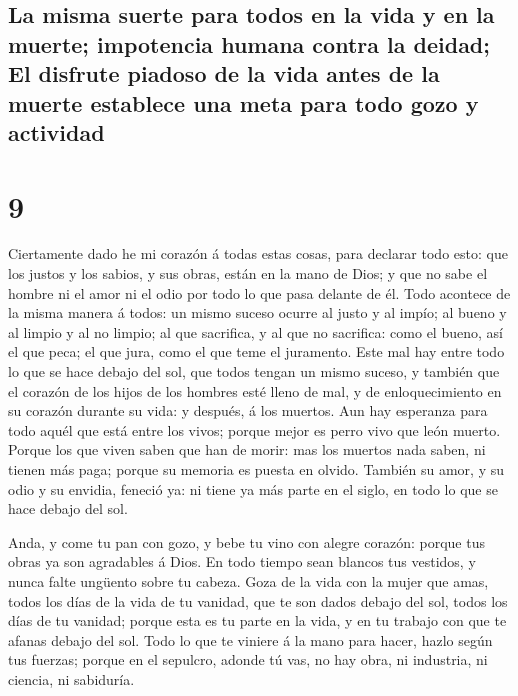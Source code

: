 \hypertarget{la-misma-suerte-para-todos-en-la-vida-y-en-la-muerte-impotencia-humana-contra-la-deidad-el-disfrute-piadoso-de-la-vida-antes-de-la-muerte-establece-una-meta-para-todo-gozo-y-actividad}{%
\subsection{La misma suerte para todos en la vida y en la muerte;
impotencia humana contra la deidad; El disfrute piadoso de la vida antes
de la muerte establece una meta para todo gozo y
actividad}\label{la-misma-suerte-para-todos-en-la-vida-y-en-la-muerte-impotencia-humana-contra-la-deidad-el-disfrute-piadoso-de-la-vida-antes-de-la-muerte-establece-una-meta-para-todo-gozo-y-actividad}}

\hypertarget{section-8}{%
\section{9}\label{section-8}}

 Ciertamente dado he mi corazón á todas estas cosas, para
declarar todo esto: que los justos y los sabios, y sus obras, están en
la mano de Dios; y que no sabe el hombre ni el amor ni el odio por todo
lo que pasa delante de él.  Todo acontece de la misma
manera á todos: un mismo suceso ocurre al justo y al impío; al bueno y
al limpio y al no limpio; al que sacrifica, y al que no sacrifica: como
el bueno, así el que peca; el que jura, como el que teme el juramento.
 Este mal hay entre todo lo que se hace debajo del sol,
que todos tengan un mismo suceso, y también que el corazón de los hijos
de los hombres esté lleno de mal, y de enloquecimiento en su corazón
durante su vida: y después, á los muertos.  Aun hay
esperanza para todo aquél que está entre los vivos; porque mejor es
perro vivo que león muerto.  Porque los que viven saben
que han de morir: mas los muertos nada saben, ni tienen más paga; porque
su memoria es puesta en olvido.  También su amor, y su
odio y su envidia, feneció ya: ni tiene ya más parte en el siglo, en
todo lo que se hace debajo del sol.

 Anda, y come tu pan con gozo, y bebe tu vino con alegre
corazón: porque tus obras ya son agradables á Dios.  En
todo tiempo sean blancos tus vestidos, y nunca falte ungüento sobre tu
cabeza.  Goza de la vida con la mujer que amas, todos los
días de la vida de tu vanidad, que te son dados debajo del sol, todos
los días de tu vanidad; porque esta es tu parte en la vida, y en tu
trabajo con que te afanas debajo del sol.  Todo lo que te
viniere á la mano para hacer, hazlo según tus fuerzas; porque en el
sepulcro, adonde tú vas, no hay obra, ni industria, ni ciencia, ni
sabiduría.

